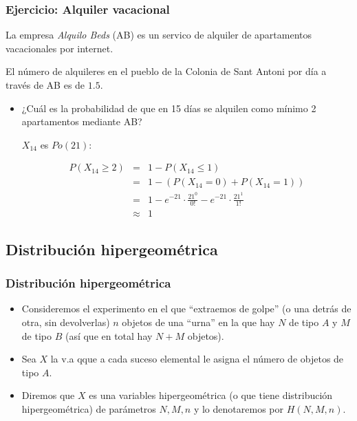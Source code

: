 \documentclass[handout]{beamer}\usepackage[]{graphicx}\usepackage[]{color}
\renewcommand{\emph}[1]{{\color{red}#1}}
\renewcommand{\leq}{\leqslant}
\renewcommand{\geq}{\geqslant}
\theoremstyle{plain}
\theoremstyle{definition}
\begin{document}
\begin{frame}
\frametitle{Ejercicio: Alquiler  vacacional}

La empresa \textsl{Alquilo Beds} (AB)   es un servico de alquiler de apartamentos vacacionales por internet.

El número de alquileres  en  el pueblo de la Colonia de Sant Antoni  por día a través de AB es de  $1.5$.

\begin{itemize}
\item ¿Cuál es la probabilidad de que en 15 días se alquilen como mínimo 2 apartamentos mediante  AB?

$X_{14}$ es $Po(21)$:

\begin{eqnarray*}
P(X_{14}\geq 2) & = & 1-P(X_{14}\leq 1)\\
& = & 1-\left(P(X_{14}=0)+P(X_{14}=1)\right)\\
& = & 1- e^{-21}\cdot \frac{21^0}{0!}- e^{-21}\cdot \frac{21^1}{1!}\\
& \approx & 1 
\end{eqnarray*}
\end{itemize}
\end{frame}

\subsection{Distribución hipergeométrica}


\begin{frame}
\frametitle{Distribución hipergeométrica}

\begin{itemize}
\item Consideremos el experimento en el que ``extraemos de golpe'' (o una detrás de otra, sin 
devolverlas) $n$ objetos de una ``urna''  en la que hay $N$ de tipo $A$ y $M$ de tipo $B$ 
(así que en total hay $N+M$ objetos).
\item Sea $X$ la v.a qque a cada suceso elemental le asigna el número de objetos de tipo $A$.
\item Diremos que $X$ es una variables \emph{hipergeométrica} (o que tiene \emph{distribución hipergeométrica}) de parámetros $N,M,n$ y lo denotaremos por \emph{$H(N,M,n)$}.
\end{itemize}
\end{frame}
\end{document}
